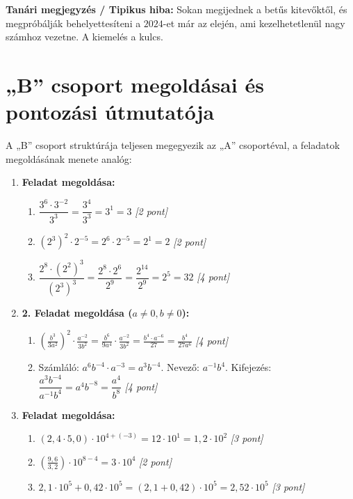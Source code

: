 \documentclass[11pt,a4paper]{article}
\begin{document}
\noindent\textbf{Tanári megjegyzés / Tipikus hiba:} 
Sokan megijednek a betűs kitevőktől, és megpróbálják behelyettesíteni a $2024$-et már az elején, ami kezelhetetlenül nagy számhoz vezetne. A kiemelés a kulcs.


\newpage
\section*{„B” csoport megoldásai és pontozási útmutatója}

A „B” csoport struktúrája teljesen megegyezik az „A” csoportéval, a feladatok megoldásának menete analóg:

\begin{enumerate}
    \item \textbf{Feladat megoldása:}
    \begin{enumerate}
        \item[a)] $\dfrac{3^6 \cdot 3^{-2}}{3^3} = \dfrac{3^4}{3^3} = 3^1 = 3$ \hfill \textit{[2 pont]}
        \item[b)] $(2^3)^2 \cdot 2^{-5} = 2^6 \cdot 2^{-5} = 2^1 = 2$ \hfill \textit{[2 pont]}
        \item[c)] $\dfrac{2^8 \cdot (2^2)^3}{(2^3)^3} = \dfrac{2^8 \cdot 2^6}{2^9} = \dfrac{2^{14}}{2^9} = 2^5 = 32$ \hfill \textit{[4 pont]}
    \end{enumerate}

    \item \textbf{2. Feladat megoldása ($a \neq 0, b \neq 0$):}
    \begin{enumerate}
        \item[a)] $\left(\frac{b^3}{3a^2}\right)^2 \cdot \frac{a^{-2}}{3b^2} = \frac{b^6}{9a^4} \cdot \frac{a^{-2}}{3b^2} = \frac{b^4 \cdot a^{-6}}{27} = \frac{b^4}{27a^6}$ \hfill \textit{[4 pont]}
        \item[b)] Számláló: $a^6 b^{-4} \cdot a^{-3} = a^3 b^{-4}$. Nevező: $a^{-1} b^4$. Kifejezés: $\dfrac{a^3 b^{-4}}{a^{-1} b^4} = a^4 b^{-8} = \dfrac{a^4}{b^8}$ \hfill \textit{[4 pont]}
    \end{enumerate}

    \item \textbf{Feladat megoldása:}
    \begin{enumerate}
        \item[a)] $(2,4 \cdot 5,0) \cdot 10^{4+(-3)} = 12 \cdot 10^1 = 1,2 \cdot 10^2$ \hfill \textit{[3 pont]}
        \item[b)] $\left(\frac{9,6}{3,2}\right) \cdot 10^{8-4} = 3 \cdot 10^4$ \hfill \textit{[2 pont]}
        \item[c)] $2,1 \cdot 10^5 + 0,42 \cdot 10^5 = (2,1 + 0,42) \cdot 10^5 = 2,52 \cdot 10^5$ \hfill \textit{[3 pont]}
    \end{enumerate}


\end{enumerate}
\end{document}
